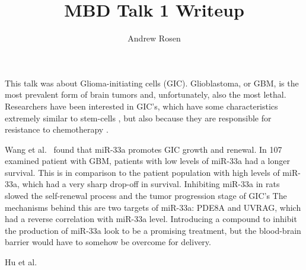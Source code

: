 \documentclass[10pt,a4paper]{article}
\author{Andrew Rosen}
\title{MBD Talk 1 Writeup}
\begin{document}
	\maketitle
	This talk was about Glioma-initiating cells (GIC).
	Glioblastoma, or GBM, is the most prevalent form of brain tumors and, unfortunately, also the most lethal.
	Researchers have been interested in GIC's, which have some characteristics extremely similar to stem-cells \cite{wang2014mir}, but also because they are responsible for resistance to chemotherapy \cite{bao2006glioma}.
	
	
	Wang et al.\ \cite{wang2014mir} found that miR-33a promotes GIC growth and renewal.
	In 107 examined patient with GBM, patients with low levels of miR-33a had a longer survival.
	This is in comparison to the patient population with high levels of miR-33a, which had a very sharp drop-off in survival.
	Inhibiting miR-33a in rats slowed the self-renewal process and the tumor progression stage of GIC's 
	The mechanisms behind this are two targets of miR-33a: PDE8A and UVRAG, which had a reverse correlation with miR-33a level.
	Introducing a compound to inhibit the production of miR-33a look to be a promising treatment, but the blood-brain barrier would have to somehow be overcome for delivery.
	
	Hu et al.\ \cite{hu2014roles}
	
	
	
	
	
	
\end{document}
